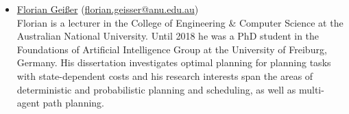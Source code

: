 \documentclass[10pt]{article}
\begin{document}
\begin{itemize}
\item \href{https://cecs.anu.edu.au/people/florian-geisser}{Florian Gei{\ss}er}
    (\href{mailto:florian.geisser@anu.edu.au}{florian.geisser@anu.edu.au})\\
        Florian is a lecturer in the College of Engineering \& Computer Science
        at the Australian National University. Until 2018 he was a PhD student
        in the Foundations of Artificial Intelligence Group at the University of
        Freiburg, Germany. His dissertation investigates optimal
        planning for planning tasks with state-dependent costs and his research
        interests span the areas of deterministic and probabilistic planning and
        scheduling, as well as multi-agent path planning.



%





\end{itemize}
\end{document}
